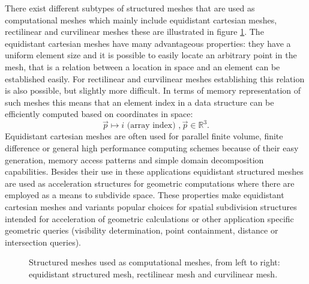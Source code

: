 \begin{frame}
There exist different subtypes of structured meshes that are used as computational meshes which mainly include equidistant cartesian meshes, rectilinear and curvilinear meshes these are
illustrated in figure \ref{fig:structured}. 
The equidistant cartesian meshes have many advantageous properties: they have a uniform element size and it is possible to easily locate an arbitrary point in the mesh, that is a relation between
a location in space and an element can be established easily. For rectilinear and curvilinear meshes establishing this relation is also possible, but slightly more difficult. 
In terms of memory representation of such meshes this means that an element index in a data structure
can be efficiently computed based on coordinates in space:
\begin{equation}
  \vec{p} \mapsto i\text{ (array index) }, \vec{p} \in \mathbb{R}^3.
  \label{eq:struct-map}
\end{equation}
Equidistant cartesian meshes are often used for parallel finite volume, finite difference or 
general high performance computing schemes because of their easy generation, memory access patterns and simple domain decomposition capabilities. Besides their use in 
these applications equidistant structured meshes are used as acceleration structures for geometric computations where there are employed as a means to subdivide space.
These properties make equidistant cartesian meshes and variants popular choices for spatial subdivision structures intended for acceleration of geometric 
calculations or other application specific geometric queries (visibility determination, point containment, distance or intersection queries).
\end{frame}

\begin{frame}
\begin{figure}[h!]
\centering
{}\hspace{0.2cm}
\hspace{0.2cm}
\caption{Structured meshes used as computational meshes, from left to right: equidistant structured mesh, rectilinear mesh and curvilinear mesh.}
\label{fig:structured}
\end{figure}
\end{frame}

